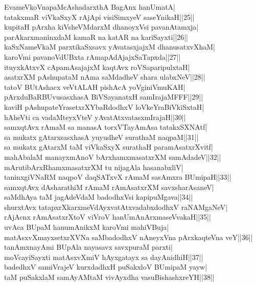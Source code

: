 \documentclass{article}
\begin{document}
EvameVkoVnapaMcAshadarxthA BagAnx hanUmatA|\\
tatakxmaR viVkaSxyX rAjApi visiSimxyeV saseYnikaH||25||\\
kupitaH pArxha kiVsheVMdarxM dhanoyxVsi pavanAtamxja|\\
parAkarxmaninxdaM kamaR na katAR na kariSayxti||26||\\
kaSxNameVkaM parxtikaSxsavx yAvatasxjajxM dhanusatxvXhaM|\\
karoVmi pavanoVdUBxta rAmapAdAjajxSaTapxda||27||\\
ituyxkAtxvX cApamAsajajxM kaqtAvx roVSaparipulxtaH|\\
asatxrXM pAshupataM nAma saMdadheV shara ulabxNeV||28||\\
tatoV BUtAshacx veVtALAH pishAcA yoVginiVmuKAH|\\
pArxduBaRBUvusasxhasA BiVSayanatxH samIrajaMFFF||29||\\
kaviH pAshupateYrasetxrXYbaRdodhxV loVkeYraBiVkiSxtaH|\\
hAheVti ca vadaMteyxVteV yAvatAtxvatasxmIrajaH||30||\\
samxqtAvx rAmaM sa manasA torxVTayAmAsa tatakxSXNAtf|\\
sa mukatx gAtarxsasxhasA yuyudheV surathaM naqpaM||31||\\
sa mukatx gAtarxM taM viVkaSxyX surathaH paramAsatxrXvitf|\\
mahAbalaM manayxmAnoV bArxhamxmasatxrXM samAdadeV||32||\\
mArutibArxRhamxmasatxrXM tu nijagAla hasanabxliV|\\
taninxgiVNaRM naqpoV daqSATxvX rAmaM sasAmxra BUmipaH||33||\\
samxqtAvx dAsharathiM rAmaM rAmAsatxrXM savxsharAsaneV|\\
saMdhAya taM jagAdeVdaM badodhxVsi kapipuMgava||34||\\
shurxtAvx tatapxrXkarxmeVdAyxvatAtxvadabxdodhxV raNAMgaNeV|\\
rAjAcnx rAmAsatxrXtoV viVroV hanUmAnArxmaseVvakaH||35||\\
uvAca BUpaM hanumAnikxM karoVmi mahiVBuja|\\
matAsxvXmayxsetxrXVNa saMbadodhxV nAneyxVna pArxkaqteVna veY||36||\\
tanAmxnayAmi BUpAla nayasavx savxpuraM parxti|\\
moVcayiSayxti matAsxvXmiV hAyxgatayx sa dayAnidhiH||37||\\
badedhxV samiVrajeV kurxdadhxH puSakxloV BUmipaM yayw|\\
taM puSakxlaM samAyAMtaM vivAyxdha vasuBishashxreYH||38||\\
\end{document}
